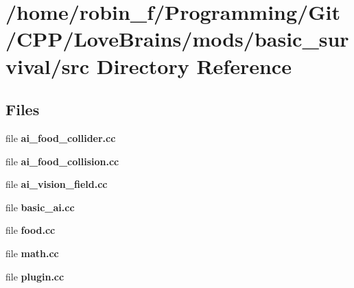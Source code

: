 \section{/home/robin\+\_\+f/\+Programming/\+Git/\+C\+P\+P/\+Love\+Brains/mods/basic\+\_\+survival/src Directory Reference}
\label{dir_3247c3b537e26c0a0d0a89b5a2ad8026}
\subsection*{Files}
\begin{DoxyCompactItemize}
\item 
file {\bfseries ai\+\_\+food\+\_\+collider.\+cc}
\item 
file {\bfseries ai\+\_\+food\+\_\+collision.\+cc}
\item 
file {\bfseries ai\+\_\+vision\+\_\+field.\+cc}
\item 
file {\bfseries basic\+\_\+ai.\+cc}
\item 
file {\bfseries food.\+cc}
\item 
file {\bfseries math.\+cc}
\item 
file {\bfseries plugin.\+cc}
\end{DoxyCompactItemize}
